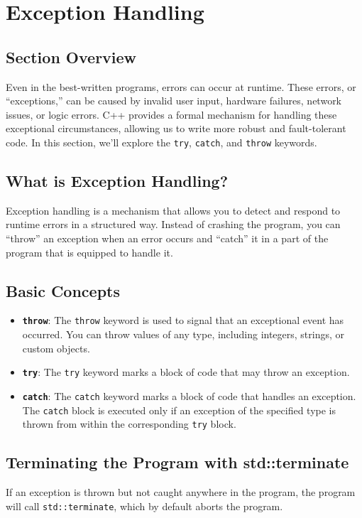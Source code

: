 \section{Exception Handling}

\subsection{Section Overview}
Even in the best-written programs, errors can occur at runtime. These errors, or ``exceptions,'' can be caused by invalid user input, hardware failures, network issues, or logic errors. C++ provides a formal mechanism for handling these exceptional circumstances, allowing us to write more robust and fault-tolerant code. In this section, we'll explore the \texttt{try}, \texttt{catch}, and \texttt{throw} keywords.

\subsection{What is Exception Handling?}
Exception handling is a mechanism that allows you to detect and respond to runtime errors in a structured way. Instead of crashing the program, you can ``throw'' an exception when an error occurs and ``catch'' it in a part of the program that is equipped to handle it.

\subsection{Basic Concepts}
\begin{itemize}
    \item \textbf{\texttt{throw}}: The \texttt{throw} keyword is used to signal that an exceptional event has occurred. You can throw values of any type, including integers, strings, or custom objects.
    \item \textbf{\texttt{try}}: The \texttt{try} keyword marks a block of code that may throw an exception.
    \item \textbf{\texttt{catch}}: The \texttt{catch} keyword marks a block of code that handles an exception. The \texttt{catch} block is executed only if an exception of the specified type is thrown from within the corresponding \texttt{try} block.
\end{itemize}

\subsection{Terminating the Program with std::terminate}
If an exception is thrown but not caught anywhere in the program, the program will call \texttt{std::terminate}, which by default aborts the program.

